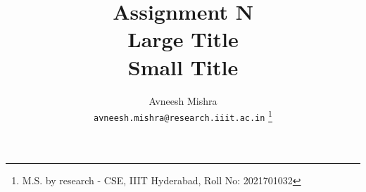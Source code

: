 

{
   \fancyhf{}
   \renewcommand{\headrulewidth}{0pt} %
}

\title{Assignment N \\
    \Large Large Title \\
    \small Small Title
}

\author{
    Avneesh Mishra \\
    \texttt{avneesh.mishra@research.iiit.ac.in}
    \thanks{M.S. by research - CSE, IIIT Hyderabad, Roll No: 2021701032}
}


    \maketitle
    \thispagestyle{fancy_tr_rno}
    \tableofcontents
    \pagebreak

